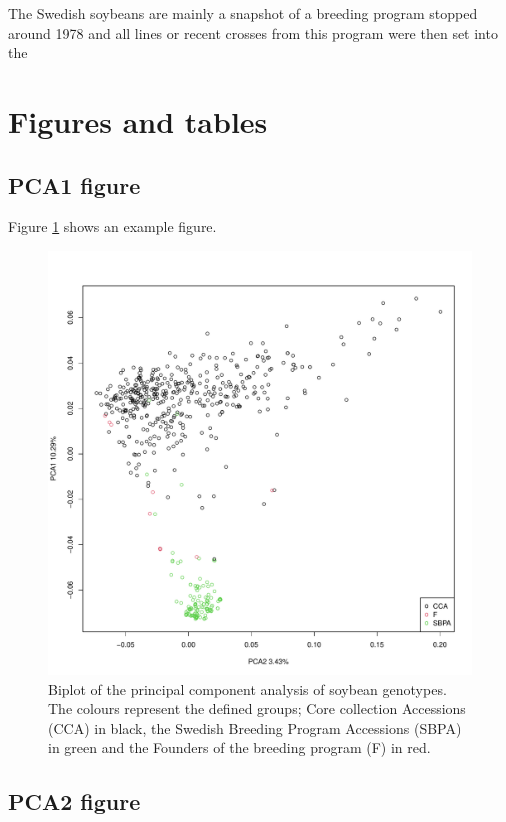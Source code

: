 \documentclass[9pt, onecolumn,twoside]{gsajnl}
\begin{document}
The Swedish soybeans are mainly a snapshot of a breeding program stopped around 1978 and all lines or recent crosses from this program were then set into the  







\section{Figures and tables}

\subsection{PCA1 figure}

Figure \ref{fig:pca} shows an example figure.

\begin{figure}[t]
\centering
\includegraphics[width=\linewidth]{plot_PCA_source.pdf}
\caption{Biplot of the principal component analysis of soybean genotypes. The colours represent the defined groups; Core collection Accessions (CCA) in black, the Swedish Breeding Program Accessions (SBPA) in green and the Founders of the breeding program (F) in red.}%
\label{fig:pca}
\end{figure}


\subsection{PCA2 figure}
\end{document}
